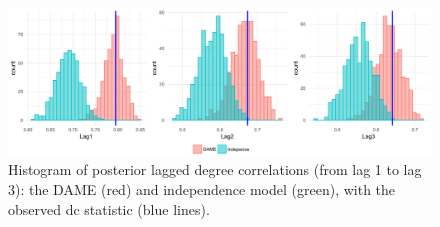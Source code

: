 \documentclass[a4paper]{article}
\begin{document}
\begin{figure}[H]
	\centering
		\includegraphics[width=1\textwidth]{plots_paper/correlations-1.png}	
	\caption {Histogram of posterior lagged degree correlations (from lag 1 to lag 3): the DAME (red) and independence model (green), with the observed dc statistic (blue lines).}
	\label{figure:correlationstudy}
\end{figure}
\end{document}
